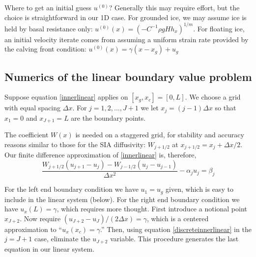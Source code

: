 \documentclass[letterpaper,final,12pt,reqno]{amsart}
\begin{document}
Where to get an initial guess $u^{(0)}$?  Generally this may require effort, but the choice is straightforward in our 1D case.  For grounded ice, we may assume ice is held by basal resistance only: $u^{(0)}(x) = \left(-C^{-1} \rho g H h_x\right)^{1/m}$.  For floating ice, an initial velocity iterate comes from assuming a uniform strain rate provided by the calving front condition: $u^{(0)}(x) = \gamma (x-x_g) + u_g$

\subsection*{Numerics of the linear boundary value problem}  Suppose equation \eqref{innerlinear} applies on $[x_g,x_c]=[0,L]$.  We choose a grid with equal spacing $\Delta x$.  For $j=1,2,\dots,J+1$ we let $x_j=(j-1)\Delta x$ so that $x_1 = 0$ and $x_{J+1} = L$ are the boundary points.

The coefficient $W(x)$ is needed on a staggered grid, for stability and accuracy reasons similar to those for the SIA diffusivity: $W_{j+1/2}$ at $x_{j+1/2} = x_j + \Delta x/2$.  Our finite difference approximation of \eqref{innerlinear} is, therefore,
\begin{equation}
  \frac{W_{j+1/2} (u_{j+1} - u_j) - W_{j-1/2} (u_{j} - u_{j-1})}{\Delta x^2} - \alpha_j u_j = \beta_j  \label{discreteinnerlinear}
\end{equation}

For the left end boundary condition we have $u_1 = u_g$ given, which is easy to include in the linear system (below).  For the right end boundary condition we have $u_x(L)=\gamma$, which requires more thought.  First introduce a notional point $x_{J+2}$.  Now require $(u_{J+2} - u_J)/(2 \Delta x) = \gamma$, which is a centered approximation to ``$u_x(x_c)=\gamma$.''  Then, using equation \eqref{discreteinnerlinear} in the $j=J+1$ case, eliminate the $u_{J+2}$ variable.  This procedure generates the last equation in our linear system.
\end{document}
